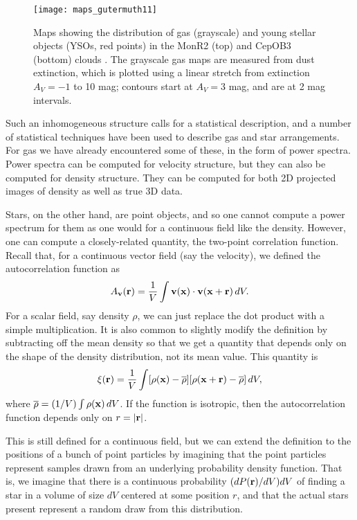 \begin{figure}
\texttt{[image: maps\_gutermuth11]}
\caption[Maps of gas and young stars in two clouds]{
\label{fig:maps_gutermuth11}
Maps showing the distribution of gas (grayscale) and young stellar objects (YSOs, red points) in the MonR2 (top) and CepOB3 (bottom) clouds \citep{gutermuth11a}. The grayscale gas maps are measured from dust extinction, which is plotted using a linear stretch from extinction $A_V = -1$ to 10 mag; contours start at $A_V=3$ mag, and are at 2 mag intervals.
}
\end{figure}

Such an inhomogeneous structure calls for a statistical description, and a number of statistical techniques have been used to describe gas and star arrangements. For gas we have already encountered some of these, in the form of power spectra. Power spectra can be computed for velocity structure, but they can also be computed for density structure. They can be computed for both 2D projected images of density as well as true 3D data.

Stars, on the other hand, are point objects, and so one cannot compute a power spectrum for them as one would for a continuous field like the density. However, one can compute a closely-related quantity, the two-point correlation function. Recall that, for a continuous vector field (say the velocity), we defined the autocorrelation function as
\begin{equation}
A_{\mathbf{v}}(\mathbf{r}) = \frac{1}{V} \int \mathbf{v}(\mathbf{x}) \cdot \mathbf{v}(\mathbf{x} + \mathbf{r})\, dV.
\end{equation}
For a scalar field, say density $\rho$, we can just replace the dot product with a simple multiplication. It is also common to slightly modify the definition by subtracting off the mean density so that we get a quantity that depends only on the shape of the density distribution, not its mean value. This quantity is
\begin{equation}
\label{eq:autocorr}
\xi(\vecr) = \frac{1}{V} \int [\rho(\vecx)-\overline{\rho}] [\rho(\vecx + \vecr)-\overline{\rho}]\, dV,
\end{equation}
where $\overline{\rho} = (1/V) \int \rho(\mathbf{x})\, dV$. If the function is isotropic, then the autocorrelation function depends only on $r=|\mathbf{r}|$.

This is still defined for a continuous field, but we can extend the definition to the positions of a bunch of point particles by imagining that the point particles represent samples drawn from an underlying probability density function. That is, we imagine that there is a continuous probability $(dP(\mathbf{r})/dV) dV$ of finding a star in a volume of size $dV$ centered at some position $r$, and that the actual stars present represent a random draw from this distribution.


